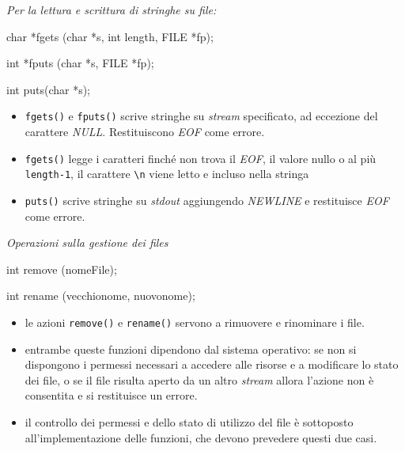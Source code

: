 \documentclass[
]{article}
\newenvironment{Shaded}{}{}
\newcommand{\DataTypeTok}[1]{\textcolor[rgb]{0.56,0.13,0.00}{#1}}
\newcommand{\NormalTok}[1]{#1}
\begin{document}
\emph{Per la lettura e scrittura di stringhe su file:}

\begin{Shaded}
\begin{Highlighting}[]
\DataTypeTok{char}\NormalTok{ *fgets (}\DataTypeTok{char}\NormalTok{ *s, }\DataTypeTok{int}\NormalTok{ length, }\DataTypeTok{FILE}\NormalTok{ *fp);}

\DataTypeTok{int}\NormalTok{ *fputs (}\DataTypeTok{char}\NormalTok{ *s, }\DataTypeTok{FILE}\NormalTok{ *fp);}

\DataTypeTok{int}\NormalTok{ puts(}\DataTypeTok{char}\NormalTok{ *s);}
 
\end{Highlighting}
\end{Shaded}

\begin{itemize}
\item
  \texttt{fgets()} e \texttt{fputs()} scrive stringhe su \emph{stream}
  specificato, ad eccezione del carattere \emph{NULL}. Restituiscono
  \emph{EOF} come errore.
\item
  \texttt{fgets()} legge i caratteri finché non trova il \emph{EOF}, il
  valore nullo o al più \texttt{length-1}, il carattere
  \texttt{\textbackslash{}n} viene letto e incluso nella stringa
\item
  \texttt{puts()} scrive stringhe su \emph{stdout} aggiungendo
  \emph{NEWLINE} e restituisce \emph{EOF} come errore.
\end{itemize}

\emph{Operazioni sulla gestione dei files}

\begin{Shaded}
\begin{Highlighting}[]
\DataTypeTok{int}\NormalTok{ remove (nomeFile);}

\DataTypeTok{int}\NormalTok{ rename (vecchionome, nuovonome);}
\end{Highlighting}
\end{Shaded}

\begin{itemize}
\item
  le azioni \texttt{remove()} e \texttt{rename()} servono a rimuovere e
  rinominare i file.
\item
  entrambe queste funzioni dipendono dal sistema operativo: se non si
  dispongono i permessi necessari a accedere alle risorse e a modificare
  lo stato dei file, o se il file risulta aperto da un altro
  \emph{stream} allora l'azione non è consentita e si restituisce un
  errore.
\item
  il controllo dei permessi e dello stato di utilizzo del file è
  sottoposto all'implementazione delle funzioni, che devono prevedere
  questi due casi.
\end{itemize}
\end{document}
